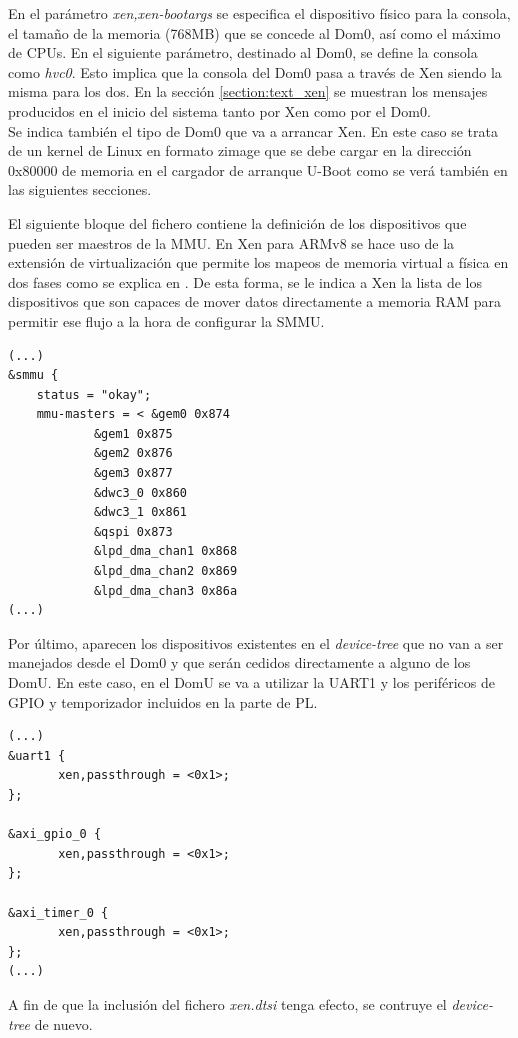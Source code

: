 En el parámetro \textit{xen,xen-bootargs} se especifica el dispositivo físico para la consola, el tamaño de la memoria (768MB) que se concede al Dom0, así como el máximo de CPUs. En el siguiente parámetro, destinado al Dom0, se define la consola como \textit{hvc0}. Esto implica que la consola del Dom0 pasa a través de Xen siendo la misma para los dos. En la sección \ref{section:text_xen} se muestran los mensajes producidos en el inicio del sistema tanto por Xen como por el Dom0.\\
Se indica también el tipo de Dom0 que va a arrancar Xen. En este caso se trata de un kernel de Linux en formato zimage que se debe cargar en la dirección 0x80000 de memoria en el cargador de arranque U-Boot como se verá también en las siguientes secciones.

El siguiente bloque del fichero contiene la definición de los dispositivos que pueden ser maestros de la MMU. En Xen para ARMv8 se hace uso de la extensión de virtualización que permite los mapeos de memoria virtual a física en dos fases como se explica en \cite{armv8_stage2}. De esta forma, se le indica a Xen la lista de los dispositivos que son capaces de mover datos directamente a memoria \acrshort{RAM} para permitir ese flujo a la hora de configurar la \acrshort{SMMU}.

\begin{lstlisting}[style=CStyle]
(...)
&smmu {
	status = "okay";
	mmu-masters = < &gem0 0x874
			&gem1 0x875
			&gem2 0x876
			&gem3 0x877
			&dwc3_0 0x860
			&dwc3_1 0x861
			&qspi 0x873
			&lpd_dma_chan1 0x868
			&lpd_dma_chan2 0x869
			&lpd_dma_chan3 0x86a
(...)
\end{lstlisting}

Por último, aparecen los dispositivos existentes en el \textit{device-tree} que no van a ser manejados desde el Dom0 y que serán cedidos directamente a alguno de los DomU. En este caso, en el DomU se va a utilizar la \acrshort{UART}1 y los periféricos de \acrshort{GPIO} y temporizador incluidos en la parte de \acrshort{PL}.

\begin{lstlisting}[style=CStyle]
(...)
&uart1 {
       xen,passthrough = <0x1>;
};

&axi_gpio_0 {
       xen,passthrough = <0x1>;
};

&axi_timer_0 {
       xen,passthrough = <0x1>;
};
(...)
\end{lstlisting}

A fin de que la inclusión del fichero \textit{xen.dtsi} tenga efecto, se contruye el \textit{device-tree} de nuevo.

